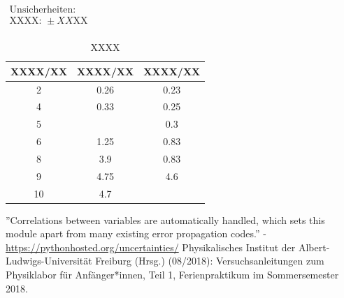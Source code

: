 \documentclass[11pt,a4paper]{article}
\begin{document}
\begin{table}[h]
\centering
\caption{XXXX} \vspace{11pt}
$\begin{array}{l}
\textrm{Unsicherheiten:}\\
\textrm{XXXX: } \pm XX \textrm{XX}\\
\end{array}$
\begin{tabular}{ccc}
\toprule
\textrm{XXXX}/\textrm{XX} & \textrm{XXXX}/\textrm{XX} & \textrm{XXXX}/\textrm{XX} \\
\midrule 
2 & 0.26 & 0.23\\
\hline
4 & 0.33 & 0.25\\
\hline 
5 & & 0.3\\
\hline 
6 & 1.25 & 0.83\\
\hline 
8 & 3.9 & 0.83\\ 
\hline
9 & 4.75 & 4.6\\ 
\hline
10 & 4.7 &\\ 
\bottomrule
\end{tabular}
\label{Tab:X}
\end{table}


\begin{thebibliography}{9}
''Correlations between variables are automatically handled, which sets this module apart from many existing error propagation codes.'' - \url{https://pythonhosted.org/uncertainties/}
 Physikalisches Institut der Albert-Ludwigs-Universität Freiburg (Hrsg.) (08/2018): Versuchsanleitungen zum Physiklabor für Anfänger*innen, Teil 1, Ferienpraktikum im Sommersemester 2018.
\end{thebibliography}
\end{document}
